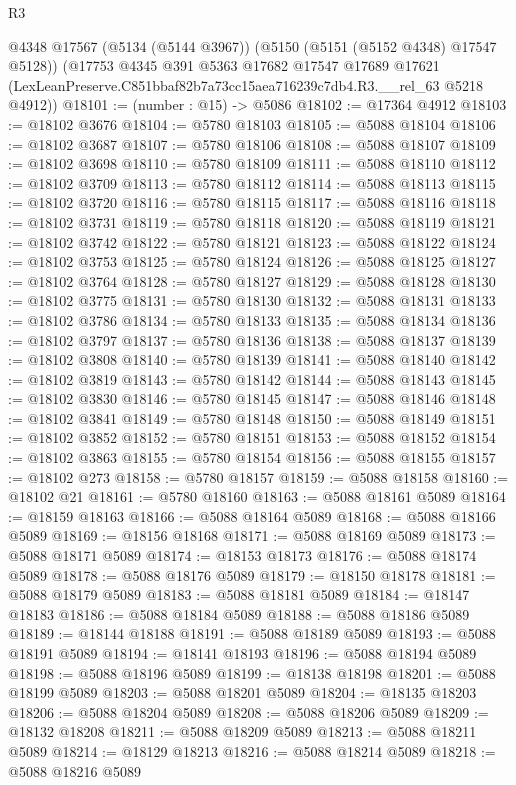 \begin{lexlean}{R3}
\begin{coremodule}
    @4348
    @17567
    (@5134 (@5144 @3967))
    (@5150 (@5151 (@5152 @4348) @17547 @5128))
    (@17753
      @4345
      @391
      @5363
      @17682
      @17547
      @17689
      @17621
      (LexLeanPreserve.C851bbaf82b7a73cc15aea716239c7db4.R3.__rel_63 @5218 @4912))
@18101 := (number : @15) -> @5086
@18102 := @17364 @4912
@18103 := @18102 @3676
@18104 := @5780 @18103
@18105 := @5088 @18104
@18106 := @18102 @3687
@18107 := @5780 @18106
@18108 := @5088 @18107
@18109 := @18102 @3698
@18110 := @5780 @18109
@18111 := @5088 @18110
@18112 := @18102 @3709
@18113 := @5780 @18112
@18114 := @5088 @18113
@18115 := @18102 @3720
@18116 := @5780 @18115
@18117 := @5088 @18116
@18118 := @18102 @3731
@18119 := @5780 @18118
@18120 := @5088 @18119
@18121 := @18102 @3742
@18122 := @5780 @18121
@18123 := @5088 @18122
@18124 := @18102 @3753
@18125 := @5780 @18124
@18126 := @5088 @18125
@18127 := @18102 @3764
@18128 := @5780 @18127
@18129 := @5088 @18128
@18130 := @18102 @3775
@18131 := @5780 @18130
@18132 := @5088 @18131
@18133 := @18102 @3786
@18134 := @5780 @18133
@18135 := @5088 @18134
@18136 := @18102 @3797
@18137 := @5780 @18136
@18138 := @5088 @18137
@18139 := @18102 @3808
@18140 := @5780 @18139
@18141 := @5088 @18140
@18142 := @18102 @3819
@18143 := @5780 @18142
@18144 := @5088 @18143
@18145 := @18102 @3830
@18146 := @5780 @18145
@18147 := @5088 @18146
@18148 := @18102 @3841
@18149 := @5780 @18148
@18150 := @5088 @18149
@18151 := @18102 @3852
@18152 := @5780 @18151
@18153 := @5088 @18152
@18154 := @18102 @3863
@18155 := @5780 @18154
@18156 := @5088 @18155
@18157 := @18102 @273
@18158 := @5780 @18157
@18159 := @5088 @18158
@18160 := @18102 @21
@18161 := @5780 @18160
@18163 := @5088 @18161 @5089
@18164 := @18159 @18163
@18166 := @5088 @18164 @5089
@18168 := @5088 @18166 @5089
@18169 := @18156 @18168
@18171 := @5088 @18169 @5089
@18173 := @5088 @18171 @5089
@18174 := @18153 @18173
@18176 := @5088 @18174 @5089
@18178 := @5088 @18176 @5089
@18179 := @18150 @18178
@18181 := @5088 @18179 @5089
@18183 := @5088 @18181 @5089
@18184 := @18147 @18183
@18186 := @5088 @18184 @5089
@18188 := @5088 @18186 @5089
@18189 := @18144 @18188
@18191 := @5088 @18189 @5089
@18193 := @5088 @18191 @5089
@18194 := @18141 @18193
@18196 := @5088 @18194 @5089
@18198 := @5088 @18196 @5089
@18199 := @18138 @18198
@18201 := @5088 @18199 @5089
@18203 := @5088 @18201 @5089
@18204 := @18135 @18203
@18206 := @5088 @18204 @5089
@18208 := @5088 @18206 @5089
@18209 := @18132 @18208
@18211 := @5088 @18209 @5089
@18213 := @5088 @18211 @5089
@18214 := @18129 @18213
@18216 := @5088 @18214 @5089
@18218 := @5088 @18216 @5089

\end{coremodule}
\end{lexlean}
